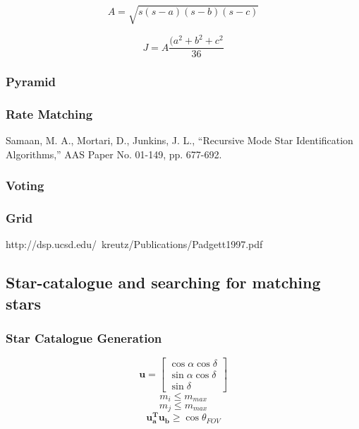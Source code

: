 \documentclass[12pt,a4paper,oneside]{article}
\begin{document}
\begin{equation}
A = \sqrt{s(s-a)(s-b)(s-c)}
\end{equation}

\begin{equation}
J = A\frac{(a^2 + b^2 + c^2}{36}
\end{equation}

\subsubsection{Pyramid}
\cite{mortari2004pyramid}\par

\subsubsection{Rate Matching}
Samaan, M. A., Mortari, D., Junkins, J. L., “Recursive Mode Star Identification
Algorithms,” AAS Paper No. 01-149, pp. 677-692. 
\subsubsection{Voting}
\cite{kolomenkin2008geometric} \par
\subsubsection{Grid}
http://dsp.ucsd.edu/~kreutz/Publications/Padgett1997.pdf
\subsection{Star-catalogue and searching for matching stars}

\subsubsection{Star Catalogue Generation}
\begin{equation}
\bm{u} = \begin{bmatrix}
\cos \alpha \cos \delta \\
\sin \alpha \cos \delta \\
\sin \delta
\end{bmatrix}
\end{equation}
\begin{equation}
m_i \leq m_{max}
\end{equation}
\begin{equation}
m_j \leq m_{max}
\end{equation}
\begin{equation}
\bm{u_a^T u_b} \geq \cos \theta_{FOV}
\end{equation}
\end{document}
